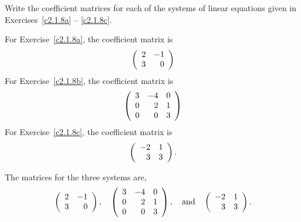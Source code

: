 \documentclass{ximera}
\begin{document}
\begin{exercise} \label{c2.1.8A}
Write the coefficient matrices for each of the systems of linear equations 
given in Exercises~\ref{c2.1.8a} -- \ref{c2.1.8c}.
\begin{prompt}
  For Exercise~\ref{c2.1.8a}, the coefficient matrix is
  \[
    \left(\begin{array}{rr} {2} & {-1}\\ 3 &{0}\end{array}\right)
  \]
  For Exercise~\ref{c2.1.8b}, the coefficient matrix is
  \[
    \left(\begin{array}{rrr} {3} & {-4} & 0 \\ 0 & {2} & 1 \\ 0 & 0 & 3\end{array}\right)
  \]
  For Exercise~\ref{c2.1.8c}, the coefficient matrix is
  \[
    \left(\begin{array}{rr} {-2} & {1}\\ {3} &{3}\end{array}\right).
  \]
\end{prompt}


\begin{solution}
\ans The matrices for the three systems are,
\[
\left(\begin{array}{rr} 2 & -1\\ 3 &0\end{array}\right), \quad
\left(\begin{array}{rrr} 3 & -4 & 0 \\ 0 & 2 & 1 \\ 0 & 0 & 3\end{array}\right), \quad\mbox{and}\quad
\left(\begin{array}{rr} -2 & 1\\ 3 &3\end{array}\right).
\]

\end{solution}
\end{exercise}
\end{document}
